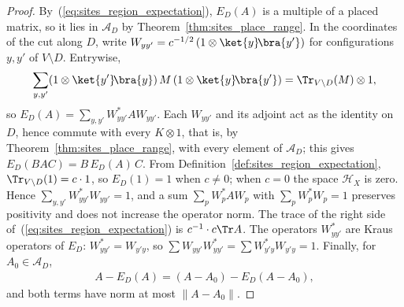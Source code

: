 \begin{proof}\leanok
    By~(\ref{eq:sites_region_expectation}), $E_D(A)$ is a multiple of a placed
    matrix, so it lies in $\mathcal A_D$ by Theorem~\ref{thm:sites_place_range}.
    In the coordinates of the cut along $D$, write $W_{yy'}=c^{-1/2}\,
    (1\otimes\ket{y}\!\bra{y'})$ for configurations $y,y'$ of $V\setminus D$.
    Entrywise,
    \begin{align}
        \sum_{y,y'}(1\otimes\ket{y'}\!\bra{y})\,M\,(1\otimes\ket{y}\!\bra{y'})
            =\Tr_{V\setminus D}(M)\otimes1,
        \label{eq:sites_region_conjugation}
    \end{align}
    so $E_D(A)=\sum_{y,y'}W_{yy'}^*AW_{yy'}$. Each $W_{yy'}$ and its adjoint act
    as the identity on $D$, hence commute with every $K\otimes1$, that is, by
    Theorem~\ref{thm:sites_place_range}, with every element of $\mathcal A_D$;
    this gives $E_D(BAC)=B\,E_D(A)\,C$. From
    Definition~\ref{def:sites_region_expectation},
    $\Tr_{V\setminus D}(1)=c\cdot1$, so $E_D(1)=1$ when $c\neq0$; when $c=0$
    the space $\mathcal H_X$ is zero. Hence $\sum_{y,y'}W_{yy'}^*W_{yy'}=1$, and
    a sum $\sum_pW_p^*AW_p$ with $\sum_pW_p^*W_p=1$ preserves positivity and does
    not increase the operator norm. The trace of the right side
    of~(\ref{eq:sites_region_expectation}) is $c^{-1}\cdot c\Tr A$. The operators
    $W_{yy'}^*$ are Kraus operators of $E_D$: $W_{yy'}^*=W_{y'y}$, so
    $\sum W_{yy'}W_{yy'}^*=\sum W_{y'y}^*W_{y'y}=1$. Finally, for $A_0\in\mathcal A_D$,
    \begin{align*}
        A-E_D(A)=(A-A_0)-E_D(A-A_0),
    \end{align*}
    and both terms have norm at most $\lVert A-A_0\rVert$.
\end{proof}

